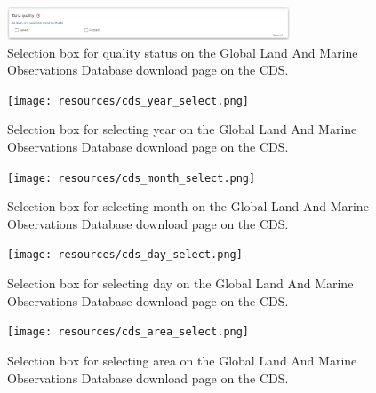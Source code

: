 \begin{figure}
\begin{center}
\includegraphics[width=0.75\textwidth]{resources/cds_qc_select.png}
\caption{Selection box for quality status on the Global Land And Marine Observations Database download page on the CDS.\\}
\label{fig:cds_qc_main}
\end{center}
\end{figure}

\begin{figure}
\begin{center}
\texttt{[image: resources/cds\_year\_select.png]}
\caption{Selection box for selecting year on the Global Land And Marine Observations Database download page on the CDS.\\}
\label{fig:cds_year_main}
\end{center}
\end{figure}

\begin{figure}
\begin{center}
\texttt{[image: resources/cds\_month\_select.png]}
\caption{Selection box for selecting month on the Global Land And Marine Observations Database download page on the CDS.\\}
\label{fig:cds_month_main}
\end{center}
\end{figure}

\begin{figure}
\begin{center}
\texttt{[image: resources/cds\_day\_select.png]}
\caption{Selection box for selecting day on the Global Land And Marine Observations Database download page on the CDS.\\}
\label{fig:cds_day_main}
\end{center}
\end{figure}

\begin{figure}
\begin{center}
\texttt{[image: resources/cds\_area\_select.png]}
\caption{Selection box for selecting area on the Global Land And Marine Observations Database download page on the CDS.\\}
\label{fig:cds_area_main}
\end{center}
\end{figure}

